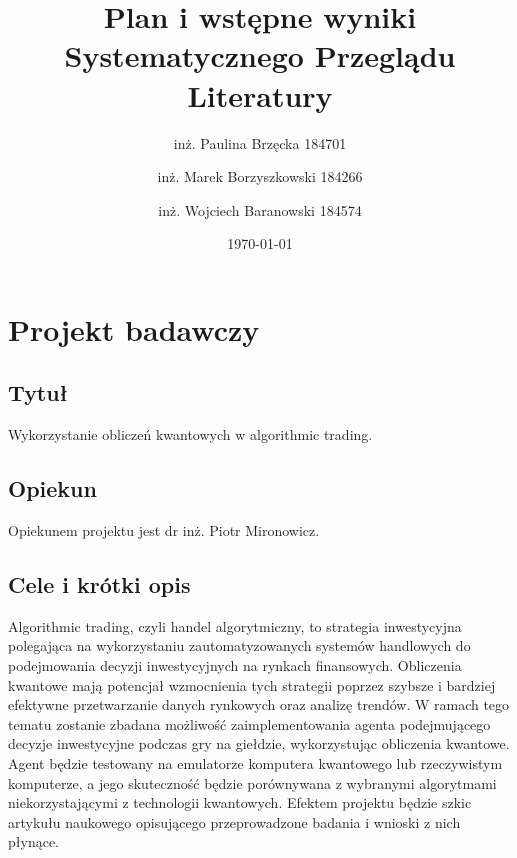 \documentclass[polish,envcountsect,10pt]{article}
\title{Plan i wstępne wyniki Systematycznego Przeglądu Literatury}
\author{inż. Paulina Brzęcka 184701 \and inż. Marek Borzyszkowski 184266 \and inż. Wojciech Baranowski 184574}
\date{\today}
\begin{document}
\maketitle
\tableofcontents
\newpage

\section{Projekt badawczy}

\subsection{Tytuł}

Wykorzystanie obliczeń kwantowych w algorithmic trading.

\subsection{Opiekun}

Opiekunem projektu jest dr inż. Piotr Mironowicz.

\subsection{Cele i krótki opis}

Algorithmic trading, czyli handel algorytmiczny, to strategia inwestycyjna polegająca na wykorzystaniu zautomatyzowanych systemów handlowych do podejmowania decyzji inwestycyjnych na rynkach finansowych. Obliczenia kwantowe mają potencjał wzmocnienia tych strategii poprzez szybsze i bardziej efektywne przetwarzanie danych rynkowych oraz analizę trendów. W ramach tego tematu zostanie zbadana możliwość zaimplementowania agenta podejmującego decyzje inwestycyjne podczas gry na giełdzie, wykorzystując obliczenia kwantowe. Agent będzie testowany na emulatorze komputera kwantowego lub rzeczywistym komputerze, a jego skuteczność będzie porównywana z wybranymi algorytmami niekorzystającymi z technologii kwantowych. Efektem projektu będzie szkic artykułu naukowego opisującego przeprowadzone badania i wnioski z nich płynące.
\end{document}
